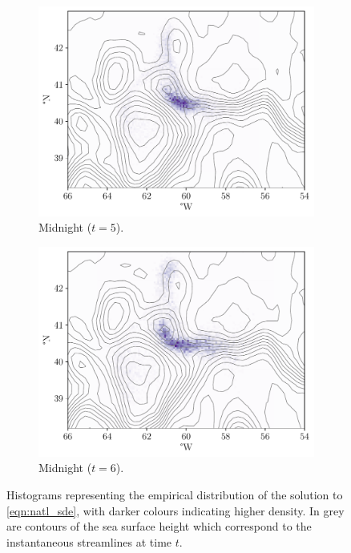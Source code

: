 \begin{figure}
\begin{subfigure}{0.49\textwidth}
	\end{subfigure}
	\begin{subfigure}{0.49\textwidth}
		\includegraphics[width=\textwidth]{chp06_applications/figures/gulf_stream/rels_ssh_5.0}
		\caption{Midnight  (\(t = 5\)).}
		\label{fig:na_hist_t3_5}
	\end{subfigure}
	\begin{subfigure}{0.49\textwidth}
		\includegraphics[width=\textwidth]{chp06_applications/figures/gulf_stream/rels_ssh_6.0}
		\caption{Midnight  (\(t = 6\)).}
		\label{fig:na_hist_t3_6}
	\end{subfigure}
	\caption{Histograms representing the empirical distribution of the solution to \cref{eqn:natl_sde}, with darker colours indicating higher density.
		In grey are contours of the sea surface height which correspond to the instantaneous streamlines at time \(t\).}
	\label{fig:na_hist_t3}
\end{figure}


